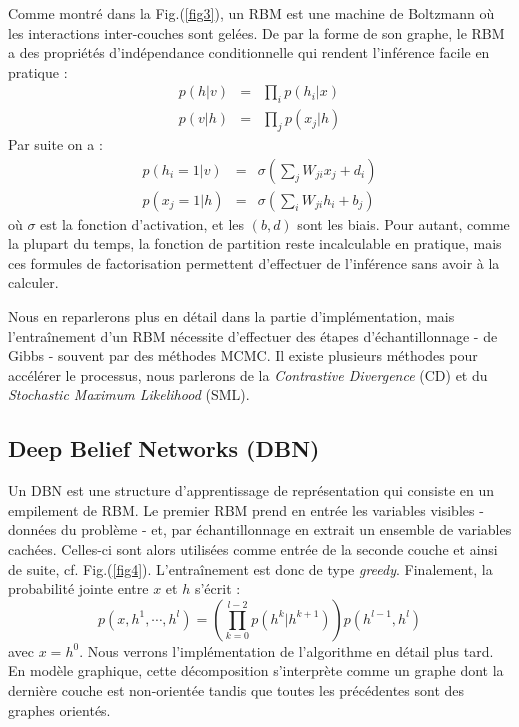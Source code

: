 \documentclass[10pt,a4paper]{article}
\begin{document}
Comme montré dans la Fig.(\ref{fig3}), un RBM est une machine de Boltzmann où les interactions inter-couches sont gelées. De par la forme de son graphe, le RBM a des propriétés d'indépendance conditionnelle qui rendent l'inférence facile en pratique : 
\begin{equation}
\begin{array}{rll}
p(h|v) & = & \displaystyle \prod_{i} p(h_i|x) \\
p(v|h) & = & \displaystyle \prod_{j} p(x_j|h)
\end{array}
\end{equation}
Par suite on a : 
\begin{equation}
\begin{array}{rll}
p(h_i = 1 |v ) & = & \displaystyle \sigma\left(\sum_j W_{ji}x_j + d_i\right) \\
p(x_j = 1 |h ) & = & \displaystyle \sigma\left(\sum_i W_{ji}h_i + b_j\right)
\end{array}
\end{equation}
où $\sigma$ est la fonction d'activation, et les $(b,d)$ sont les biais. Pour autant, comme la plupart du temps, la fonction de partition reste incalculable en pratique, mais ces formules de factorisation permettent d'effectuer de l'inférence sans avoir à la calculer.

Nous en reparlerons plus en détail dans la partie d'implémentation, mais l'entraînement d'un RBM nécessite d'effectuer des étapes d'échantillonnage - de Gibbs - souvent par des méthodes MCMC. Il existe plusieurs méthodes pour accélérer le processus, nous parlerons de la \emph{Contrastive Divergence} (CD) et du \emph{Stochastic Maximum Likelihood} (SML).

%

\subsection{Deep Belief Networks (DBN)}

Un DBN est une structure d'apprentissage de représentation qui consiste en un empilement de RBM. Le premier RBM prend en entrée les variables visibles - données du problème - et, par échantillonnage en extrait un ensemble de variables cachées. Celles-ci sont alors utilisées comme entrée de la seconde couche et ainsi de suite, cf. Fig.(\ref{fig4}). L'entraînement est donc de type \emph{greedy}. Finalement, la probabilité jointe entre $x$ et $h$ s'écrit :
\begin{equation}
p(x, h^1, \cdots, h^l) = \left( \prod_{k=0}^{l-2} p(h^k |h^{k+1}) \right) p(h^{l-1}, h^l)
\end{equation}
avec $x=h^0$. Nous verrons l'implémentation de l'algorithme en détail plus tard. En modèle graphique, cette décomposition s'interprète comme un graphe dont la dernière couche est non-orientée tandis que toutes les précédentes sont des graphes orientés.
\end{document}
